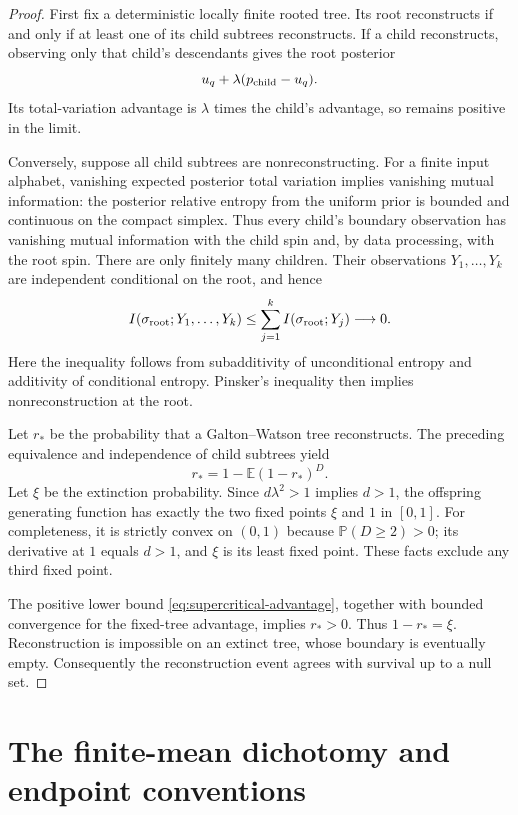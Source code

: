 \begin{proof}
First fix a deterministic locally finite rooted tree.  Its root
reconstructs if and only if at least one of its child subtrees reconstructs.
If a child reconstructs, observing only that child's descendants gives
the root posterior
\[
 u_q+\lambda(p_{\rm child}-u_q).
\]
Its total-variation advantage is $\lambda$ times the child's advantage,
so remains positive in the limit.

Conversely, suppose all child subtrees are nonreconstructing.  For a finite
input alphabet, vanishing expected posterior total variation implies
vanishing mutual information: the posterior relative entropy from the
uniform prior is bounded and continuous on the compact simplex.  Thus
every child's boundary observation has vanishing mutual information with
the child spin and, by data processing, with the root spin.  There are
only finitely many children.  Their observations $Y_1,\ldots,Y_k$ are
independent conditional on the root, and hence
\[
 I(\sigma_{\rm root};Y_1,\ldots,Y_k)
 \le\sum_{j=1}^k I(\sigma_{\rm root};Y_j)\longrightarrow0.
\]
Here the inequality follows from subadditivity of unconditional entropy
and additivity of conditional entropy.  Pinsker's inequality then implies
nonreconstruction at the root.

Let $r_* $ be the probability that a Galton--Watson tree reconstructs.
The preceding equivalence and independence of child subtrees yield
\[
 r_*=1-\mathbb E(1-r_*)^D.
\]
Let $\xi$ be the extinction probability.  Since
$d\lambda^2>1$ implies $d>1$, the offspring generating function has
exactly the two fixed points $\xi$ and $1$ in $[0,1]$.  For completeness,
it is strictly convex on $(0,1)$ because $\mathbb P(D\ge2)>0$;
its derivative at $1$ equals $d>1$, and $\xi$ is its least fixed point.
These facts exclude any third fixed point.

The positive lower bound \eqref{eq:supercritical-advantage}, together
with bounded convergence for the fixed-tree advantage, implies $r_*>0$.
Thus $1-r_*=\xi$.  Reconstruction is impossible on an extinct tree,
whose boundary is eventually empty.  Consequently the reconstruction
event agrees with survival up to a null set.
\end{proof}

\section{The finite-mean dichotomy and endpoint conventions}
\label{sec:full-gw-dichotomy}

